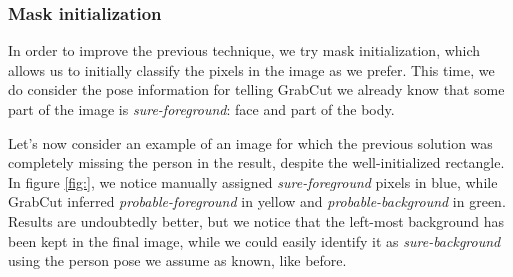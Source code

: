 \subsubsection{Mask initialization}
\label{subsec:masking-grabcut-mask}

In order to improve the previous technique, we try mask initialization, which allows us to initially classify the pixels in the image as we prefer. This time, we do consider the pose information for telling GrabCut we already know that some part of the image is \textit{sure-foreground}: face and part of the body.

Let's now consider an example of an image for which the previous solution was completely missing the person in the result, despite the well-initialized rectangle.
In figure \ref{fig:}, we notice manually assigned \textit{sure-foreground} pixels in blue, while GrabCut inferred \textit{probable-foreground} in yellow and \textit{probable-background} in green. Results are undoubtedly better, but we notice that the left-most background has been kept in the final image, while we could easily identify it as \textit{sure-background} using the person pose we assume as known, like before.

